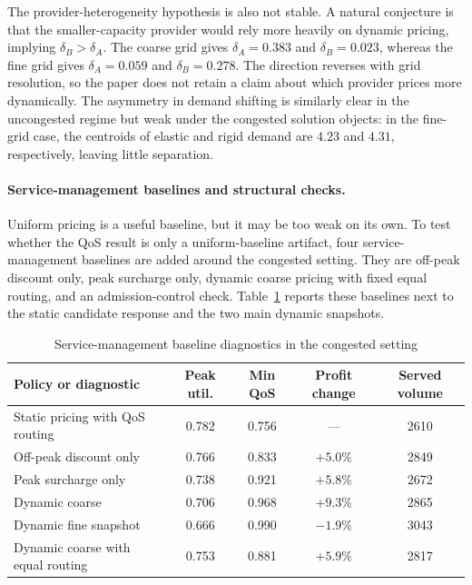 \documentclass[11pt,a4paper]{article}
\begin{document}
The provider-heterogeneity hypothesis is also not stable. A natural conjecture is that the smaller-capacity provider would rely more heavily on dynamic pricing, implying $\delta_B>\delta_A$. The coarse grid gives $\delta_A=0.383$ and $\delta_B=0.023$, whereas the fine grid gives $\delta_A=0.059$ and $\delta_B=0.278$. The direction reverses with grid resolution, so the paper does not retain a claim about which provider prices more dynamically. The asymmetry in demand shifting is similarly clear in the uncongested regime but weak under the congested solution objects: in the fine-grid case, the centroids of elastic and rigid demand are $4.23$ and $4.31$, respectively, leaving little separation.

\paragraph{Service-management baselines and structural checks.}

Uniform pricing is a useful baseline, but it may be too weak on its own. To test whether the QoS result is only a uniform-baseline artifact, four service-management baselines are added around the congested setting. They are off-peak discount only, peak surcharge only, dynamic coarse pricing with fixed equal routing, and an admission-control check. Table~\ref{tab:smpt_baselines} reports these baselines next to the static candidate response and the two main dynamic snapshots.

\begin{table}[H]
\centering
\caption{Service-management baseline diagnostics in the congested setting}
\label{tab:smpt_baselines}
\small
\begin{tabular}{lcccc}
\toprule
Policy or diagnostic & Peak util. & Min QoS & Profit change & Served volume \\
\midrule
Static pricing with QoS routing & 0.782 & 0.756 & --- & 2610 \\
Off-peak discount only & 0.766 & 0.833 & $+5.0\%$ & 2849 \\
Peak surcharge only & 0.738 & 0.921 & $+5.8\%$ & 2672 \\
Dynamic coarse & 0.706 & 0.968 & $+9.3\%$ & 2865 \\
Dynamic fine snapshot & 0.666 & 0.990 & $-1.9\%$ & 3043 \\
Dynamic coarse with equal routing & 0.753 & 0.881 & $+5.9\%$ & 2817 \\
\bottomrule
\end{tabular}
\end{table}
\end{document}
